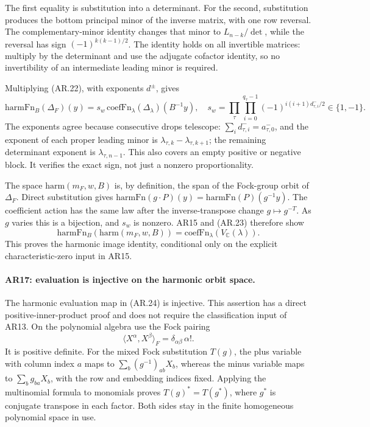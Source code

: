 The first equality is substitution into a determinant. For the
second, substitution produces the bottom principal minor of the
inverse matrix, with one row reversal. The complementary-minor
identity changes that minor to $L_{n-k}/\det$, while the reversal
has sign $(-1)^{k(k-1)/2}$. The identity holds on all invertible
matrices: multiply by the determinant and use the adjugate
cofactor identity, so no invertibility of an intermediate leading
minor is required.

Multiplying (AR.22), with exponents $d^\pm$, gives
\[
 \mathrm{harmFn}_{B}(\Delta_F)(y)
       =s_w\,\mathrm{coefFn}_{\lambda}(\Delta_\lambda)(B^{-1}y),
 \quad
 s_w=\prod_{\tau}\prod_{i=0}^{q_\tau-1}
             (-1)^{i(i+1)d^-_{\tau,i}/2}\in\{1,-1\}.
                                                               \tag{AR.23}
\]
The exponents agree because consecutive drops telescope:
$\sum_i d^-_{\tau,i}=a^-_{\tau,0}$, and the exponent of each
proper leading minor is
$\lambda_{\tau,k}-\lambda_{\tau,k+1}$; the remaining determinant
exponent is $\lambda_{\tau,n-1}$. This also covers an empty positive
or negative block. It verifies the exact sign, not just a nonzero
proportionality.

The space $\mathrm{harm}(m_F,w,B)$ is, by definition, the span of
the Fock-group orbit of $\Delta_F$. Direct substitution gives
$\mathrm{harmFn}(g\cdot P)(y)=\mathrm{harmFn}(P)(g^{-1}y)$.
The coefficient action has the same law after the inverse-transpose
change $g\mapsto g^{-T}$. As $g$ varies this is a bijection, and
$s_w$ is nonzero. AR15 and (AR.23) therefore show
\[
 \mathrm{harmFn}_{B}(\mathrm{harm}(m_F,w,B))
              =\mathrm{coefFn}_{\lambda}(V_{\mathbb C}(\lambda)).
                                                               \tag{AR.24}
\]
This proves the harmonic image identity, conditional only on the
explicit characteristic-zero input in AR15.

\paragraph{AR17: evaluation is injective on the harmonic orbit space.}
The harmonic evaluation map in (AR.24) is injective. This assertion
has a direct positive-inner-product proof and does not require
the classification input of AR13.
On the polynomial algebra use the Fock pairing
\[
 \langle X^\alpha,X^\beta\rangle_F
                       =\delta_{\alpha\beta}\,\alpha!.
                                                               \tag{AR.25}
\]
It is positive definite. For the mixed Fock substitution $T(g)$,
the plus variable with column index $a$ maps to
$\sum_b(g^{-1})_{ab}X_b$, whereas the minus variable maps to
$\sum_b g_{ba}X_b$, with the row and embedding indices fixed.
Applying the multinomial
formula to monomials proves
$T(g)^*=T(g^*)$, where $g^*$ is conjugate transpose in each factor.
Both sides stay in the finite homogeneous polynomial space in use.

